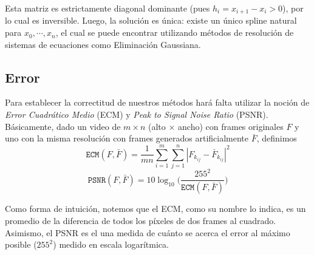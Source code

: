 Esta matriz es estrictamente diagonal dominante (pues $h_i = x_{i + 1} - x_i > 0$), por lo cual es inversible\cite{properties_of_diagonally_dominant_matrix}. Luego, la solución es única: existe un único spline natural para $x_0, \cdots, x_n$, el cual se puede encontrar utilizando métodos de resolución de sistemas de ecuaciones como Eliminación Gaussiana\cite{TP1}.

\subsection{Error}
Para establecer la correctitud de nuestros métodos hará falta utilizar la noción de \emph{Error Cuadr\'atico Medio} (ECM) y \emph{Peak to Signal Noise Ratio} (PSNR). Básicamente, dado un video de $m \times n$ (alto $\times$ ancho) con frames originales $F$ y uno con la misma resolución con frames generados artificialmente $\bar{F}$, definimos  
$$\texttt{ECM}(F,\bar{F}) = \frac{1}{mn}\sum_{i=1}^m\sum_{j = 1}^n |F_{k_{ij}} - \bar{F}_{k_{ij}}|^2$$
$$\texttt{PSNR}(F,\bar{F}) = 10 \log_{10}\bigg(\frac{255^2}{\texttt{ECM}(F,\bar{F})}\bigg)$$

Como forma de intuición, notemos que el ECM, como su nombre lo indica, es un promedio de la diferencia de todos los píxeles de dos frames al cuadrado. Asimismo, el PSNR es el una medida de cuánto se acerca el error al máximo posible ($255^2$) medido en escala logarítmica.